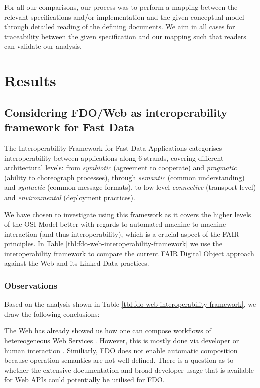 \documentclass[fleqn,10pt,lineno]{wlpeerjlua}
\begin{document}
For all our comparisons, our process was to perform a mapping between the relevant specifications and/or implementation and the given conceptual model through detailed reading of the defining documents. We aim in all cases for traceability between the given specification and our mapping such that readers can validate our analysis. 

\section*{Results}\label{sec:results}

\subsection*{Considering FDO/Web as interoperability framework for Fast Data}\label{sec:interoperability-compare}

The Interoperability Framework for Fast Data Applications \autocite{delgadoInteroperabilityFrameworkDistributed2016a} categorises interoperability between applications along 6 strands, covering different architectural levels: from \emph{symbiotic} (agreement to cooperate) and \emph{pragmatic} (ability to choreograph processes), through \emph{semantic} (common understanding) and \emph{syntactic} (common message formats), to low-level \emph{connective} (transport-level) and \emph{environmental} (deployment practices).

We have chosen to investigate using this framework as it covers the higher levels of the OSI Model \autocite{stallingsHandbookComputercommunicationsStandards1990} better with regards to automated machine-to-machine interaction (and thus interoperability), which is a crucial aspect of the FAIR principles. In Table \vref{tbl:fdo-web-interoperability-framework} we use the interoperability framework to compare the current FAIR Digital Object approach against the Web and its Linked Data practices.

\subsubsection*{Observations}
Based on the analysis shown in Table \ref{tbl:fdo-web-interoperability-framework}, we draw the following conclusions:

The Web has already showed us how one can compose workflows of hetereogeneous Web Services \autocite{wolstencroftTavernaWorkflowSuite2013d}. However, this is mostly done via developer or human interaction \autocite{lamprechtPerspectivesAutomatedComposition2021b}. Similiarly, FDO does not enable automatic composition because operation semantics are not well defined. There is a question as to whether the extensive documentation and broad developer usage that is available for Web APIs could potentially be utilised for FDO.
\end{document}

